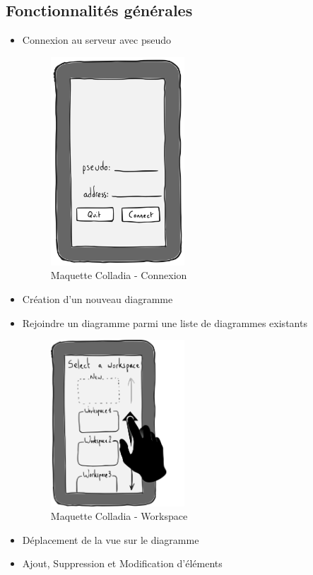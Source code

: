 \documentclass[a4paper,11pt]{article}
\begin{document}
\subsection{Fonctionnalités générales}
	\begin{itemize}
		\item Connexion au serveur avec pseudo
		\begin{figure}[h]
			\centering
			\includegraphics[width=5cm]{img/accueil}
			\caption{Maquette Colladia - Connexion}
		\end{figure}
		
		\item Création d'un nouveau diagramme
		\item Rejoindre un diagramme parmi une liste de diagrammes existants
		\begin{figure}[h]
			\centering
			\includegraphics[width=5cm]{img/workspace-selection}
			\caption{Maquette Colladia - Workspace}
		\end{figure}
		
		\item Déplacement de la vue sur le diagramme
		\item Ajout, Suppression et Modification d'éléments
	\end{itemize}
	
\end{document}
